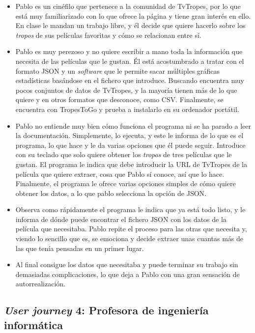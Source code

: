 \begin{itemize}
    \item Pablo es un cinéfilo que pertenece a la comunidad de TvTropes, por lo
    que está muy familiarizado con lo que ofrece la página y tiene gran interés
    en ello. En clase le mandan un trabajo libre, y él decide que quiere hacerlo
    sobre los \textit{tropos} de sus películas favoritas y cómo se relacionan
    entre sí.
    \item Pablo es muy perezoso y no quiere escribir a mano toda la información
    que necesita de las películas que le gustan. Él está acostumbrado a tratar
    con el formato JSON y un \textit{software} que le permite sacar múltiples
    gráficas estadísticas basándose en el fichero que introduce. Buscando
    encuentra muy pocos conjuntos de datos de TvTropes, y la mayoría tienen más
    de lo que quiere y en otros formatos que desconoce, como CSV. Finalmente, se
    encuentra con TropesToGo y prueba a instalarlo en su ordenador portátil.
    \item Pablo no entiende muy bien cómo funciona el programa ni se ha parado a
    leer la documentación. Simplemente, lo ejecuta, y este le informa de lo que
    es el programa, lo que hace y le da varias opciones que él puede seguir.
    Introduce con su teclado que solo quiere obtener los \textit{tropos} de tres
    películas que le gustan. El programa le indica que debe introducir la URL de
    TvTropes de la película que quiere extraer, cosa que Pablo sí conoce, así
    que lo hace. Finalmente, el programa le ofrece varias opciones simples de
    cómo quiere obtener los datos, a lo que pablo selecciona la opción de JSON.
    \item Observa como rápidamente el programa le indica que ya está todo listo,
    y le informa de dónde puede encontrar el fichero JSON con los datos de la
    película que necesitaba. Pablo repite el proceso para las otras que necesita
    y, viendo lo sencillo que es, se emociona y decide extraer unas cuantas más
    de las que tenía pensadas en un primer lugar.
    \item Al final consigue los datos que necesitaba y puede terminar su trabajo
    sin demasiadas complicaciones, lo que deja a Pablo con una gran sensación de
    autorrealización.
\end{itemize}

\subsection{\textit{User journey} 4: Profesora de ingeniería informática} 

